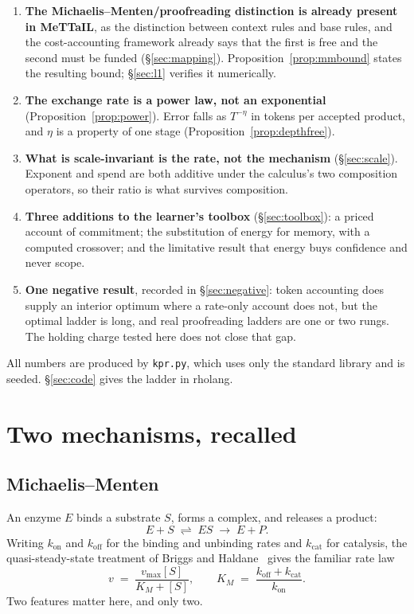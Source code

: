 \documentclass[11pt]{article}
\theoremstyle{plain}
\theoremstyle{definition}
\theoremstyle{remark}
\begin{document}
\begin{enumerate}[leftmargin=*,label=(\arabic*)]
\item \textbf{The Michaelis--Menten/proofreading distinction is already present
  in MeTTaIL}, as the distinction between context rules and base rules, and
  the cost-accounting framework already says that the first is free and the
  second must be funded (\S\ref{sec:mapping}). Proposition~\ref{prop:mmbound}
  states the resulting bound; \S\ref{sec:l1} verifies it numerically.
\item \textbf{The exchange rate is a power law, not an exponential}
  (Proposition~\ref{prop:power}). Error falls as $T^{-\eta}$ in tokens per
  accepted product, and $\eta$ is a property of one stage
  (Proposition~\ref{prop:depthfree}).
\item \textbf{What is scale-invariant is the rate, not the mechanism}
  (\S\ref{sec:scale}). Exponent and spend are both additive under the
  calculus's two composition operators, so their ratio is what survives
  composition.
\item \textbf{Three additions to the learner's toolbox} (\S\ref{sec:toolbox}):
  a priced account of commitment; the substitution of energy for memory,
  with a computed crossover; and the limitative result that energy buys
  confidence and never scope.
\item \textbf{One negative result}, recorded in \S\ref{sec:negative}: token
  accounting does supply an interior optimum where a rate-only account does
  not, but the optimal ladder is long, and real proofreading ladders are one
  or two rungs. The holding charge tested here does not close that gap.
\end{enumerate}

All numbers are produced by \texttt{kpr.py}, which uses only the standard
library and is seeded. \S\ref{sec:code} gives the ladder in rholang.

\section{Two mechanisms, recalled}

\subsection{Michaelis--Menten}

An enzyme $E$ binds a substrate $S$, forms a complex, and releases a product:
\[
E + S \;\rightleftharpoons\; ES \;\longrightarrow\; E + P .
\]
Writing $k_{\mathrm{on}}$ and $k_{\mathrm{off}}$ for the binding and unbinding
rates and $k_{\mathrm{cat}}$ for catalysis, the quasi-steady-state treatment of
Briggs and Haldane~\cite{BH1925} gives the familiar rate law
\[
v \;=\; \frac{v_{\max}[S]}{K_M + [S]},
\qquad
K_M \;=\; \frac{k_{\mathrm{off}} + k_{\mathrm{cat}}}{k_{\mathrm{on}}} .
\]
Two features matter here, and only two.
\end{document}
